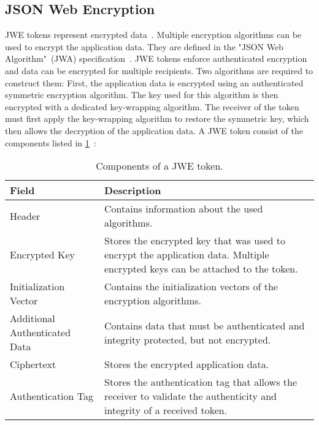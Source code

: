 \documentclass[../main.tex]{subfiles}
\begin{document}
\subsection{JSON Web Encryption}
\label{sec:jwe}
JWE tokens represent encrypted data~\cite{JWE2015}.
Multiple encryption algorithms can be used to encrypt the application data.
They are defined in the "JSON Web Algorithm"~(JWA) specification~\cite{JWA2015}.
JWE tokens enforce authenticated encryption and data can be encrypted for multiple recipients.
Two algorithms are required to construct them:
First, the application data is encrypted using an authenticated symmetric encryption algorithm.
The key used for this algorithm is then encrypted with a dedicated key-wrapping algorithm.
The receiver of the token must first apply the key-wrapping algorithm to restore the symmetric key, which then allows the decryption of the application data.
A JWE token consist of the components listed in \cref{tab:jwe}~\cite{JWE2015}:

\begin{table}[ht]
    \centering
    \begin{tabular}{l p{9cm}}
        \hline
    \textbf{Field}                             & \textbf{Description}                                                                                                            \\ \hline
    Header                       & Contains information about the used algorithms.                                                                        \\ 
    Encrypted Key                 & Stores the encrypted key that was used to encrypt the application data. Multiple encrypted keys can be attached to the token.                                               \\ 
    Initialization Vector         & Contains the initialization vectors of the encryption algorithms.                                                     \\ 
    Additional Authenticated Data & Contains data that must be authenticated and integrity protected, but not encrypted.                                   \\ 
    Ciphertext                    & Stores the encrypted application data.                                                                                 \\ 
    Authentication Tag            & Stores the authentication tag that allows the receiver to validate the authenticity and integrity of a received token. \\ \hline
    \end{tabular}
    \caption[Structure of a JWE token]{Components of a JWE token.}
    \label{tab:jwe}
\end{table}
\end{document}
